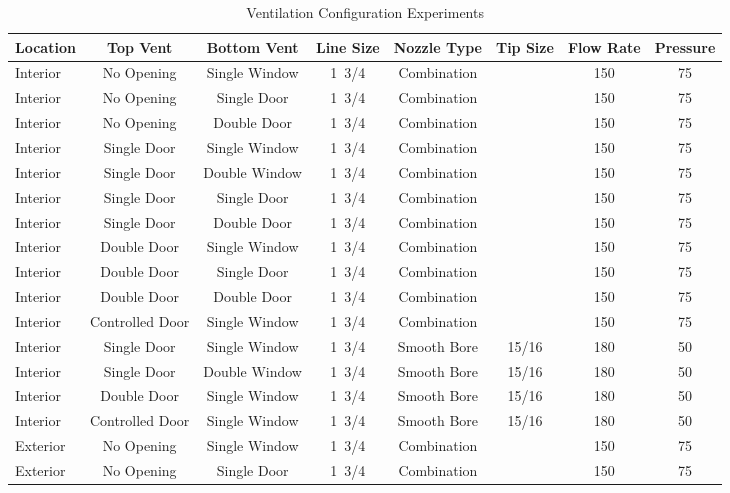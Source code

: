 \documentclass[12pt,oneside]{book}
\begin{document}
\begin{table}[!ht]
\centering
\footnotesize
\caption{Ventilation Configuration Experiments}
\label{tab:Ventilation_Configuration_Experiments}
\begin{tabular}{lccccccc}
\toprule[1.5pt]
Location & Top Vent        & Bottom Vent     & Line Size & Nozzle Type & Tip Size & Flow Rate & Pressure \\ 
\midrule
Interior & No Opening      & Single Window   & 1~3/4 & Combination &       & 150 & 75 \\
Interior & No Opening      & Single Door     & 1~3/4 & Combination &       & 150 & 75 \\
Interior & No Opening      & Double Door     & 1~3/4 & Combination &       & 150 & 75 \\
Interior & Single Door     & Single Window   & 1~3/4 & Combination &       & 150 & 75 \\
Interior & Single Door     & Double Window   & 1~3/4 & Combination &       & 150 & 75 \\
Interior & Single Door     & Single Door     & 1~3/4 & Combination &       & 150 & 75 \\
Interior & Single Door     & Double Door     & 1~3/4 & Combination &       & 150 & 75 \\
Interior & Double Door     & Single Window   & 1~3/4 & Combination &       & 150 & 75 \\
Interior & Double Door     & Single Door     & 1~3/4 & Combination &       & 150 & 75 \\
Interior & Double Door     & Double Door     & 1~3/4 & Combination &       & 150 & 75 \\
Interior & Controlled Door & Single Window   & 1~3/4 & Combination &       & 150 & 75 \\
\midrule
Interior & Single Door     & Single Window   & 1~3/4 & Smooth Bore & 15/16 & 180 & 50 \\
Interior & Single Door     & Double Window   & 1~3/4 & Smooth Bore & 15/16 & 180 & 50 \\
Interior & Double Door     & Single Window   & 1~3/4 & Smooth Bore & 15/16 & 180 & 50 \\
Interior & Controlled Door & Single Window   & 1~3/4 & Smooth Bore & 15/16 & 180 & 50 \\
\midrule
Exterior & No Opening      & Single Window   & 1~3/4 & Combination &       & 150 & 75 \\
Exterior & No Opening      & Single Door     & 1~3/4 & Combination &       & 150 & 75 \\

\end{tabular}
\end{table}
\end{document}
